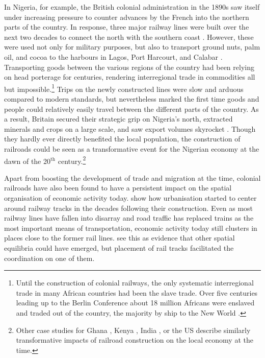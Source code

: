 \documentclass[11pt, oneside]{article}   	%
\begin{document}
In Nigeria, for example, the British colonial administration in the 1890s saw itself under increasing pressure to counter advances by the French into the northern parts of the country. In response, three major railway lines were built over the next two decades to connect the north with the southern coast \citep{Falola_historyNigeria_2008}. However, these were used not only for military purposes, but also to transport ground nuts, palm oil, and cocoa to the harbours in Lagos, Port Harcourt, and Calabar \citep{ekundare_economic_1973}. Transporting goods between the various regions of the country had been relying on head porterage for centuries, rendering interregional trade in commodities all but impossible.\footnote{Until the construction of colonial railways, the only systematic interregional trade in many African countries had been the slave trade. Over five centuries leading up to the Berlin Conference about 18 million Africans were enslaved and traded out of the country, the majority by ship to the New World \citep{nunn_long-term_2008}.} Trips on the newly constructed lines were slow and arduous compared to modern standards, but nevertheless marked the first time goods and people could relatively easily travel between the different parts of the country.\citep{chaves_reinventing_2013} As a result, Britain secured their strategic grip on Nigeria's north, extracted minerals and crops on a large scale, and saw export volumes skyrocket \citep{Falola_historyNigeria_2008,woltjer_economic_2018}. Though they hardly ever directly benefited the local population, the construction of railroads could be seen as a transformative event for the Nigerian economy at the dawn of the 20$^{\textrm{th}}$ century.\footnote{Other case studies for Ghana \citep{jedwab_permanent_2016}, Kenya \citep{jedwab_history_2017}, India \citep{Donaldson_RailroadsRajEstimating_2018}, or the US \citep{donaldson_railroads_2016,swisher_reassessing_2017} describe similarly transformative impacts of railroad construction on the local economy at the time.}

Apart from boosting the development of trade and migration at the time, colonial railroads have also been found to have a persistent impact on the spatial organisation of economic activity today. \cite{jedwab_permanent_2016} show how urbanisation started to center around railway tracks in the decades following their construction. Even as most railway lines have fallen into disarray and road traffic has replaced trains as the most important means of transportation, economic activity today still clusters in places close to the former rail lines. \citeauthor{jedwab_permanent_2016} see this as evidence that other spatial equilibria could have emerged, but placement of rail tracks facilitated the coordination on one of them.
\end{document}
